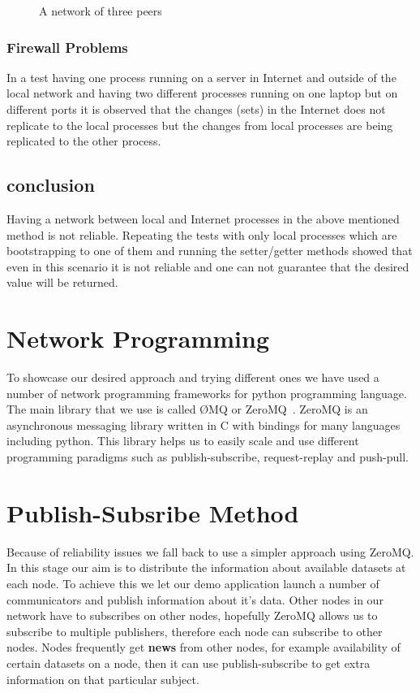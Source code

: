 \begin{figure}
\centering
{}
\caption{A network of three peers}
\label{fig:threepeers}
\end{figure}


\subsubsection{Firewall Problems}
In a test having one process running on a server in Internet and outside of the local network and having two different processes running on one laptop but on different ports it is observed that the changes (sets) in the Internet does not replicate to the local processes but the changes from local processes are being replicated to the other process.

\subsection{conclusion}
Having a network between local and Internet processes in the above mentioned method is not reliable. Repeating the tests with only local processes which are bootstrapping to one of them and running the setter/getter methods showed that even in this scenario it is not reliable and one can not guarantee that the desired value will be returned.


\section{Network Programming}
To showcase our desired approach and trying different ones we have used a number of network programming frameworks for python programming language. The main library that we use is called ØMQ or ZeroMQ~\cite{ZeroMQ}. ZeroMQ is an asynchronous messaging library written in C with bindings for many languages including python. This library helps us to easily scale and use different programming paradigms such as publish-subscribe, request-replay and push-pull.

\section{Publish-Subsribe Method}
Because of reliability issues we fall back to use a simpler approach using ZeroMQ. In this stage our aim is to distribute the information about available datasets at each node. To achieve this we let our demo application launch a number of communicators and publish information about it's data. Other nodes in our network have to subscribes on other nodes, hopefully ZeroMQ allows us to subscribe to multiple publishers, therefore each node can subscribe to other nodes. Nodes frequently get \textbf{news} from other nodes, for example availability of certain datasets on a node, then it can use publish-subscribe to get extra information on that particular subject.

